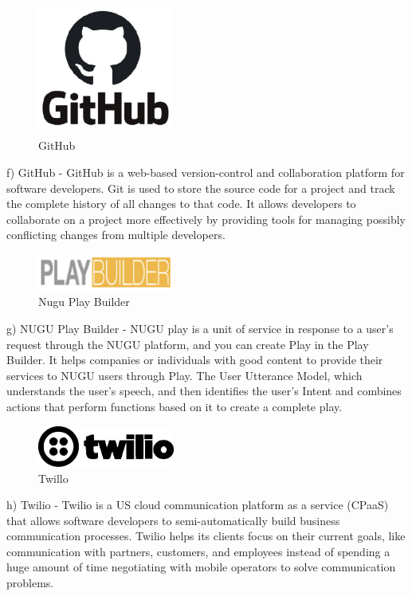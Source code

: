\documentclass[conference]{IEEEtran}
\begin{document}
\begin{figure}[!htbp]
\centering
    \includegraphics[width =4.5cm]{pictures/github.eps}
    \hfil
\caption{GitHub}
\end{figure}

f)	GitHub
-	GitHub is a web-based version-control and collaboration platform for software developers. Git is used to store the source code for a project and track the complete history of all changes to that code. It allows developers to collaborate on a project more effectively by providing tools for managing possibly conflicting changes from multiple developers.

\begin{figure}[!htbp]
\centering
    \includegraphics[width =4.5cm]{pictures/nuguplaybuilder.eps}
    \hfil
\caption{Nugu Play Builder}
\end{figure}

g)	NUGU Play Builder
-	NUGU play is a unit of service in response to a user's request through the NUGU platform, and you can create Play in the Play Builder. It helps companies or individuals with good content to provide their services to NUGU users through Play. The User Utterance Model, which understands the user's speech, and then identifies the user's Intent and combines actions that perform functions based on it to create a complete play.

\begin{figure}[!htbp]
\centering
    \includegraphics[width =4.5cm]{pictures/twilio.eps}
    \hfil
\caption{Twillo}
\end{figure}
h)	Twilio
-	Twilio is a US cloud communication platform as a service (CPaaS) that allows software developers to semi-automatically build business communication processes. Twilio helps its clients focus on their current goals, like communication with partners, customers, and employees instead of spending a huge amount of time negotiating with mobile operators to solve communication problems.\\
\end{document}
